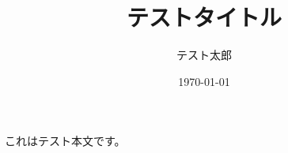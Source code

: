\documentclass{article}
\title{テストタイトル}
\author{テスト太郎}
\date{\today}
\begin{document}
\maketitle

これはテスト本文です。
\end{document}
